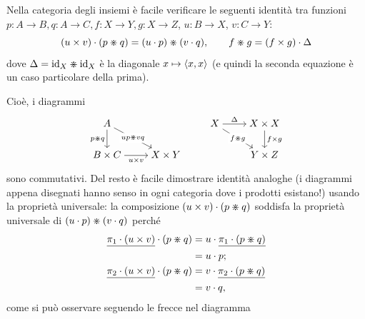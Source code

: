 \begin{remark}\label{eqn_del_prodotto}
 Nella categoria degli insiemi è facile verificare le seguenti identità tra funzioni \(p\colon A\to B,q \colon A\to C,f \colon X\to Y,g \colon X\to Z\), \(u\colon B\to X\), \(v\colon C\to Y\):
 \[(u\times v)\cdot (p\divideontimes q) = (u\cdot p)\divideontimes (v\cdot q), \qquad f\divideontimes g = (f\times g)\cdot\Delta\]
 dove \(\Delta=\mathrm{id}_X\divideontimes \mathrm{id}_X\) è la diagonale \(x\mapsto \langle x,x\rangle\) (e quindi la seconda equazione è un caso particolare della prima).

 Cioè, i diagrammi
 \[\begin{tikzcd}[cramped]
   A && X & {X\times X} \\
   {B\times C} & {X\times Y} && {Y\times Z}
   \arrow["{p\pmap q}"', from=1-1, to=2-1]
   \arrow["{up\pmap vq}"{description}, from=1-1, to=2-2]
   \arrow["\Delta", from=1-3, to=1-4]
   \arrow["{f\pmap g}"{description}, from=1-3, to=2-4]
   \arrow["{f\times g}", from=1-4, to=2-4]
   \arrow["{u\times v}"', from=2-1, to=2-2]
  \end{tikzcd}\]
 sono commutativi. Del resto è facile dimostrare identità analoghe (i diagrammi appena disegnati hanno senso in ogni categoria dove i prodotti esistano!) usando la proprietà universale: la composizione \((u\times v)\cdot (p\divideontimes q)\) soddisfa la proprietà universale di \((u\cdot p)\divideontimes (v\cdot q)\) perché
 \begin{align*}
  \underline{\pi_1\cdot (u\times v)}\cdot (p\divideontimes q) & = u\cdot \underline{\pi_1 \cdot (p\divideontimes q)} \\
                                                   & = u\cdot p;                                \\
  \underline{\pi_2\cdot (u\times v)}\cdot (p\divideontimes q) & =v\cdot \underline{\pi_2 \cdot (p\divideontimes q)}  \\
                                                   & =v\cdot q,
 \end{align*}
 come si può osservare seguendo le frecce nel diagramma

\end{remark}
